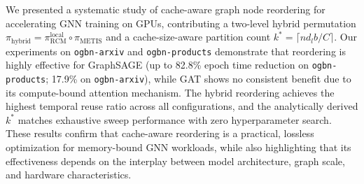 \documentclass[sigconf,review]{acmart}
\begin{document}
We presented a systematic study of cache-aware graph node reordering for accelerating GNN training on GPUs, contributing a two-level hybrid permutation $\pi_{\text{hybrid}} = \pi_{\text{RCM}}^{\text{local}} \circ \pi_{\text{METIS}}$ and a cache-size-aware partition count $k^* = \lceil n d_l b / C \rceil$.
Our experiments on \texttt{ogbn-arxiv} and \texttt{ogbn-products} demonstrate that reordering is highly effective for GraphSAGE (up to 82.8\% epoch time reduction on \texttt{ogbn-products}; 17.9\% on \texttt{ogbn-arxiv}), while GAT shows no consistent benefit due to its compute-bound attention mechanism.
The hybrid reordering achieves the highest temporal reuse ratio across all configurations, and the analytically derived $k^*$ matches exhaustive sweep performance with zero hyperparameter search.
These results confirm that cache-aware reordering is a practical, lossless optimization for memory-bound GNN workloads, while also highlighting that its effectiveness depends on the interplay between model architecture, graph scale, and hardware characteristics.



\end{document}

